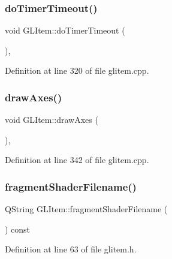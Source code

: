 \subsubsection{\texorpdfstring{doTimerTimeout()}{doTimerTimeout()}}
{\footnotesize\ttfamily void G\+L\+Item\+::do\+Timer\+Timeout (\begin{DoxyParamCaption}{ }\end{DoxyParamCaption})\hspace{0.3cm}{\ttfamily [protected]}, {\ttfamily [virtual]}}



Definition at line 320 of file glitem.\+cpp.

\mbox{\label{class_g_l_item_aef70de1482fa71495a178626566f4f3a}} 
\subsubsection{\texorpdfstring{drawAxes()}{drawAxes()}}
{\footnotesize\ttfamily void G\+L\+Item\+::draw\+Axes (\begin{DoxyParamCaption}{ }\end{DoxyParamCaption})\hspace{0.3cm}{\ttfamily [protected]}, {\ttfamily [virtual]}}



Definition at line 342 of file glitem.\+cpp.

\mbox{\label{class_g_l_item_a8b2e0c9769ceddce3e79959cce359236}} 
\subsubsection{\texorpdfstring{fragmentShaderFilename()}{fragmentShaderFilename()}}
{\footnotesize\ttfamily Q\+String G\+L\+Item\+::fragment\+Shader\+Filename (\begin{DoxyParamCaption}{ }\end{DoxyParamCaption}) const\hspace{0.3cm}{\ttfamily [inline]}}



Definition at line 63 of file glitem.\+h.

\mbox{\label{class_g_l_item_a9ee193afb733b9dc81f3c1e0eed39880}} 
